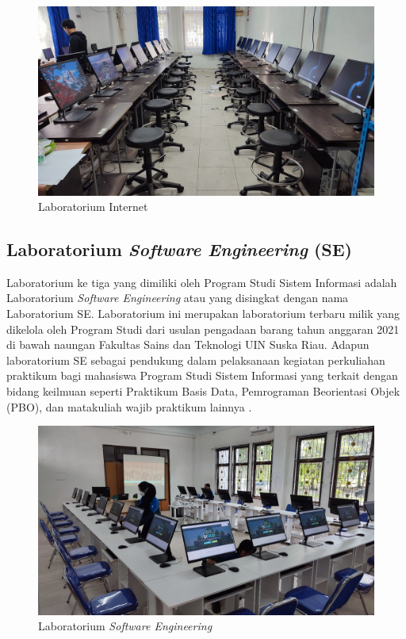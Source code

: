 \begin{figure}
	\centering
	\includegraphics[width=0.82\linewidth]{konten/gambar/lab-internet.jpg}
	\caption{Laboratorium Internet \protect\cite{labsi2023}}
	\label{fig:lab-int}
\end{figure}

\subsection{Laboratorium \textit{Software Engineering} (SE)}
Laboratorium ke tiga yang dimiliki oleh Program Studi Sistem Informasi adalah Laboratorium \textit{Software Engineering} atau yang disingkat dengan nama Laboratorium SE. Laboratorium ini merupakan laboratorium terbaru milik yang dikelola oleh Program Studi dari usulan pengadaan barang tahun anggaran 2021 di bawah naungan Fakultas Sains dan Teknologi UIN Suska Riau. Adapun laboratorium SE sebagai pendukung dalam pelaksanaan kegiatan perkuliahan praktikum bagi mahasiswa Program Studi Sistem Informasi yang terkait dengan bidang keilmuan seperti Praktikum Basis Data, Pemrograman Beorientasi Objek (PBO), dan matakuliah wajib praktikum lainnya \cite{lab-si-website}.

\begin{figure}
	\centering
	\includegraphics[width=0.82\linewidth]{konten/gambar/lab-se.jpg}
	\caption{Laboratorium \textit{Software Engineering} \protect\cite{labsi2023}}
	\label{fig:lab-se}
\end{figure}

